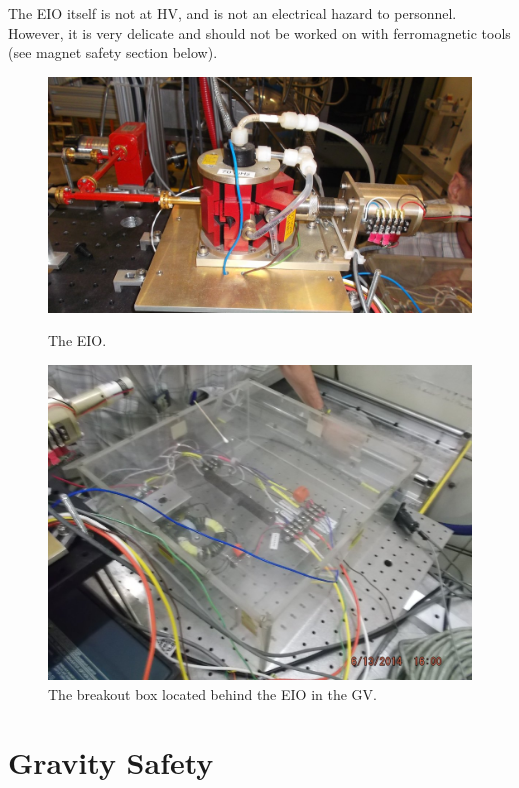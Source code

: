 The EIO itself is not at HV, and is not an electrical hazard to personnel.  However, it is very delicate and should not be worked on with ferromagnetic tools (see magnet safety section below).
\begin{figure}[htbp!]
 \centering
 \begin{minipage}{0.45\textwidth}
   \includegraphics[width=\textwidth]{./img/hv-safety-eio.jpg}
   \caption{The EIO.}
 \label{fig:hv-safety-eio}
  \end{minipage}
 \quad
  \begin{minipage}{0.45\textwidth}
   \includegraphics[width=\textwidth]{./img/hv-safety-eio-breakout.jpg}
   \caption{The breakout box located behind the EIO in the GV.}
 \label{fig:hv-safety-eio-breakout}
  \end{minipage}
\end{figure}
\section{Gravity Safety}

